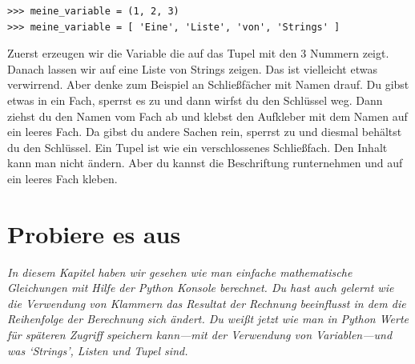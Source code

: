 \begin{Verbatim}[frame=single]
>>> meine_variable = (1, 2, 3)
>>> meine_variable = [ 'Eine', 'Liste', 'von', 'Strings' ]
\end{Verbatim}

Zuerst erzeugen wir die Variable  die auf das Tupel mit den 3 Nummern zeigt. Danach lassen wir  auf eine Liste von Strings zeigen. Das ist vielleicht etwas verwirrend. Aber denke zum Beispiel an Schließfächer mit Namen drauf. Du gibst etwas in ein Fach, sperrst es zu und dann wirfst du den Schlüssel weg. Dann ziehst du den Namen vom Fach ab und klebst den Aufkleber mit dem Namen auf ein leeres Fach. Da gibst du andere Sachen rein, sperrst zu und diesmal behältst du den Schlüssel. Ein Tupel ist wie ein verschlossenes Schließfach. Den Inhalt kann man nicht ändern.  Aber du kannst die Beschriftung runternehmen und auf ein leeres Fach kleben.

\section{Probiere es aus}

\emph{In diesem Kapitel haben wir gesehen wie man einfache mathematische Gleichungen mit Hilfe der Python Konsole berechnet. Du hast auch gelernt wie die Verwendung von Klammern das Resultat der Rechnung beeinflusst in dem die Reihenfolge der Berechnung sich ändert. Du weißt jetzt wie man in Python Werte für späteren Zugriff speichern kann---mit der Verwendung von Variablen---und was `Strings', Listen und Tupel sind.}
\par


